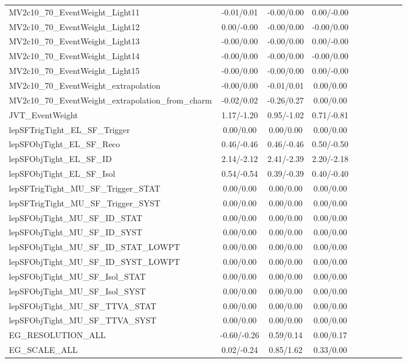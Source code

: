 \begin{table}[h]
\begin{center}
\begin{tabular}{l|ccccccccc}
MV2c10\_70\_EventWeight\_Light11 &-0.01/0.01 &-0.00/0.00 &0.00/-0.00 \\
MV2c10\_70\_EventWeight\_Light12 &0.00/-0.00 &-0.00/0.00 &-0.00/0.00 \\
MV2c10\_70\_EventWeight\_Light13 &-0.00/0.00 &-0.00/0.00 &0.00/-0.00 \\
MV2c10\_70\_EventWeight\_Light14 &-0.00/0.00 &-0.00/0.00 &-0.00/0.00 \\
MV2c10\_70\_EventWeight\_Light15 &-0.00/0.00 &-0.00/0.00 &0.00/-0.00 \\
MV2c10\_70\_EventWeight\_extrapolation &-0.00/0.00 &-0.01/0.01 &0.00/0.00 \\
MV2c10\_70\_EventWeight\_extrapolation\_from\_charm &-0.02/0.02 &-0.26/0.27 &0.00/0.00 \\
JVT\_EventWeight &1.17/-1.20 &0.95/-1.02 &0.71/-0.81 \\
lepSFTrigTight\_EL\_SF\_Trigger &0.00/0.00 &0.00/0.00 &0.00/0.00 \\
lepSFObjTight\_EL\_SF\_Reco &0.46/-0.46 &0.46/-0.46 &0.50/-0.50 \\
lepSFObjTight\_EL\_SF\_ID &2.14/-2.12 &2.41/-2.39 &2.20/-2.18 \\
lepSFObjTight\_EL\_SF\_Isol &0.54/-0.54 &0.39/-0.39 &0.40/-0.40 \\
lepSFTrigTight\_MU\_SF\_Trigger\_STAT &0.00/0.00 &0.00/0.00 &0.00/0.00 \\
lepSFTrigTight\_MU\_SF\_Trigger\_SYST &0.00/0.00 &0.00/0.00 &0.00/0.00 \\
lepSFObjTight\_MU\_SF\_ID\_STAT &0.00/0.00 &0.00/0.00 &0.00/0.00 \\
lepSFObjTight\_MU\_SF\_ID\_SYST &0.00/0.00 &0.00/0.00 &0.00/0.00 \\
lepSFObjTight\_MU\_SF\_ID\_STAT\_LOWPT &0.00/0.00 &0.00/0.00 &0.00/0.00 \\
lepSFObjTight\_MU\_SF\_ID\_SYST\_LOWPT &0.00/0.00 &0.00/0.00 &0.00/0.00 \\
lepSFObjTight\_MU\_SF\_Isol\_STAT &0.00/0.00 &0.00/0.00 &0.00/0.00 \\
lepSFObjTight\_MU\_SF\_Isol\_SYST &0.00/0.00 &0.00/0.00 &0.00/0.00 \\
lepSFObjTight\_MU\_SF\_TTVA\_STAT &0.00/0.00 &0.00/0.00 &0.00/0.00 \\
lepSFObjTight\_MU\_SF\_TTVA\_SYST &0.00/0.00 &0.00/0.00 &0.00/0.00 \\
EG\_RESOLUTION\_ALL &-0.60/-0.26 &0.59/0.14 &0.00/0.17 \\
EG\_SCALE\_ALL &0.02/-0.24 &0.85/1.62 &0.33/0.00 \\

\end{tabular}
\end{center}
\end{table}

